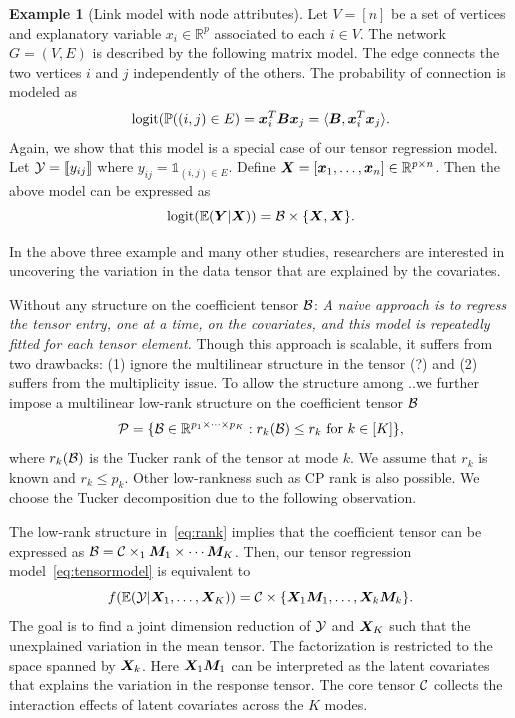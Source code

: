\documentclass[twoside]{article}
\theoremstyle{plain}
\theoremstyle{definition}
\newtheorem{example}{Example}
\begin{document}
 \begin{example}[Link model with node attributes] Let $V=[n]$ be a set of vertices and explanatory variable $x_i\in\mathbb{R}^p$ associated to each $i\in V$. The network $G=(V,E)$ is described by the following matrix model. The edge connects the two vertices $i$ and $j$ independently of the others. The probability of connection is modeled as
 \[
 \text{logit}(\mathbb{P}((i,j)\in E)=\bm x^T_i\bm B\bm x_j=\langle \bm B, \bm x^T_i\bm x_j\rangle.
 \]
Again, we show that this model is a special case of our tensor regression model. Let $\mathcal{Y}=\llbracket y_{ij} \rrbracket$ where $y_{ij}=\mathds{1}_{(i,j)\in E}$. Define $\bm X=[\bm x_1,\ldots,\bm x_n]\in\mathbb{R}^{p\times n}$. Then the above model can be expressed as
 \[
 \text{logit}(\mathbb{E}(\bm Y|\bm X))=\mathcal{B}\times\{\bm X,\bm X\}.
 \]
\end{example}
In the above three example and many other studies, researchers are interested in uncovering the variation in the data tensor that are explained by the covariates. 

Without any structure on the coefficient tensor $\mathcal{B}$: \emph{A naive approach is to regress the tensor entry, one at a time, on the covariates, and this model is repeatedly fitted for each tensor element.} Though this approach is scalable, it suffers from two drawbacks: (1) ignore the multilinear structure in the tensor (?) and (2) suffers from the multiplicity issue. To allow the structure among ..we further impose a multilinear low-rank structure on the coefficient tensor $\mathcal{B}$
\begin{equation}\label{eq:rank}
\mathcal{P}=\{\mathcal{B}\in\mathbb{R}^{p_1\times \cdots \times p_K}: r_k(\mathcal{B})\leq r_k \text{ for } k\in[K]\},
\end{equation}
where $r_k(\mathcal{B})$ is the Tucker rank of the tensor at mode $k$. We assume that $r_k$ is known and $r_k\leq p_k$. Other low-rankness such as CP rank is also possible. We choose the Tucker decomposition due to the following observation. 

The low-rank structure in~\eqref{eq:rank} implies that the coefficient tensor can be expressed as $\mathcal{B}=\mathcal{C}\times_1\bm M_1\times \cdots\bm M_K$. Then, our tensor regression model~\eqref{eq:tensormodel} is equivalent to
\[
f(\mathbb{E}(\mathcal{Y}|\bm X_1,\ldots,\bm X_K))=\mathcal{C}\times\{\bm X_1\bm M_1,\ldots,\bm X_k\bm M_k\}.
\]
The goal is to find a joint dimension reduction of $\mathcal{Y}$ and $\bm X_K$ such that the unexplained variation in the mean tensor. The factorization is restricted to the space spanned by $\bm X_k$. Here $\bm X_1\bm M_1$ can be interpreted as the latent covariates that explains the variation in the response tensor. The core tensor $\mathcal{C}$ collects the interaction effects of latent covariates across the $K$ modes.  
\end{document}
